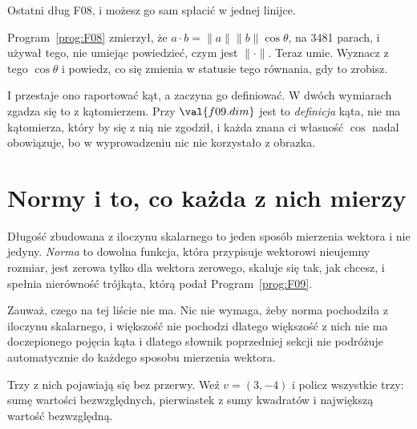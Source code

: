 
\begin{fr}
Ostatni dług F08, i możesz go sam spłacić w jednej linijce.

Program~\ref{prog:F08} zmierzył, że $a \cdot b = \lVert a \rVert \lVert b
\rVert \cos\theta$, na 3481 parach, i używał tego, nie umiejąc powiedzieć, czym
jest $\lVert \cdot \rVert$. Teraz umie. Wyznacz z tego $\cos\theta$ i powiedz,
co się zmienia w statusie tego równania, gdy to zrobisz.
\nextframe
\end{fr}

\begin{fr}
I przestaje ono raportować kąt, a zaczyna go definiować. W dwóch wymiarach
zgadza się to z kątomierzem. Przy $\val{f09.dim}$ jest to
\emph{definicja} kąta, nie ma kątomierza, który by się z nią nie zgodził, i
każda znana ci własność $\cos$ nadal obowiązuje, bo w wyprowadzeniu nic nie
korzystało z obrazka.
\end{fr}

\section{Normy i to, co każda z nich mierzy}
\label{sec:P05-norms}

\begin{fr}
Długość zbudowana z iloczynu skalarnego to jeden sposób mierzenia wektora i nie
jedyny. \emph{Norma} to dowolna funkcja, która przypisuje wektorowi nieujemny
rozmiar, jest zerowa tylko dla wektora zerowego, skaluje się tak, jak chcesz, i
spełnia nierówność trójkąta, którą podał Program~\ref{prog:F09}.

Zauważ, czego na tej liście nie ma. Nic nie wymaga, żeby norma pochodziła z
iloczynu skalarnego, i większość nie pochodzi \dash{} dlatego większość z nich
nie ma doczepionego pojęcia kąta i dlatego słownik poprzedniej sekcji nie
podróżuje automatycznie do każdego sposobu mierzenia wektora.

Trzy z nich pojawiają się bez przerwy. Weź $v = (3, -4)$ i policz wszystkie
trzy: sumę wartości bezwzględnych, pierwiastek z sumy kwadratów i największą
wartość bezwzględną.
\dotline
\nextframe
\end{fr}

